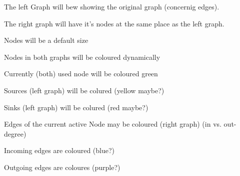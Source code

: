 \begin{list}{-}{}
\item The left Graph will bew showing the original graph (concernig edges).
\item The right graph will have it's nodes at the same place as the left graph.
\item Nodes will be a default size
\item Nodes in both graphs will be coloured dynamically
\begin{list}{-}{}
\item Currently (both) used node will be coloured green
\item Sources (left graph) will be colured (yellow maybe?)
\item Sinks (left graph) will be colured (red maybe?)
\end{list}
\item Edges of the current active Node may be coloured (right graph) (in vs. out-degree)
\begin{list}{-}{}
\item Incoming edges are coloured (blue?)
\item Outgoing edges are coloures (purple?)
\end{list}
\end{list}




